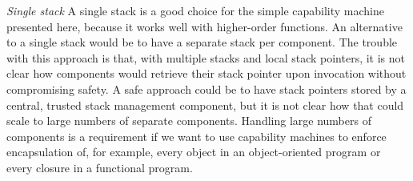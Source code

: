 \documentclass{llncs}
\newcommand{\sectionname}{Sec.}
\newcommand{\plainperm}[1]{\textsc{#1}}
\newcommand{\noperm}{\plainperm{o}}
\begin{document}
\emph{Single stack} A single stack is a good choice for the simple capability
machine presented here, because it works well with higher-order functions. An
alternative to a single stack would be to have a separate stack per component.
The trouble with this approach is that, with multiple stacks and local stack
pointers, it is not clear how components would retrieve their stack pointer upon
invocation without compromising safety. A safe approach could be to have stack
pointers stored by a central, trusted stack management component, but it is not
clear how that could scale to large numbers of separate components. Handling
large numbers of components is a requirement if we want to use
capability machines to enforce encapsulation of, for example, every object in an
object-oriented program or every closure in a functional program.
\\\\


\end{document}
